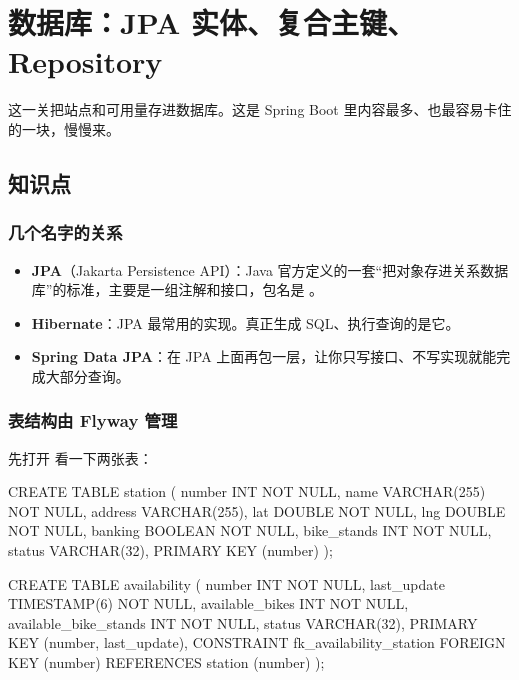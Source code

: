 \chapter{数据库：JPA 实体、复合主键、Repository}

这一关把站点和可用量存进数据库。这是 Spring Boot 里内容最多、也最容易卡住的一块，慢慢来。


\section{知识点}

\subsection{几个名字的关系}

\begin{itemize}
  \item \textbf{JPA}（Jakarta Persistence API）：Java 官方定义的一套“把对象存进关系数据库”的标准，主要是一组注解和接口，包名是 。
  \item \textbf{Hibernate}：JPA 最常用的实现。真正生成 SQL、执行查询的是它。
  \item \textbf{Spring Data JPA}：在 JPA 上面再包一层，让你只写接口、不写实现就能完成大部分查询。
\end{itemize}

\subsection{表结构由 Flyway 管理}

先打开  看一下两张表：

\begin{sql}
CREATE TABLE station (
    number      INT          NOT NULL,
    name        VARCHAR(255) NOT NULL,
    address     VARCHAR(255),
    lat         DOUBLE       NOT NULL,
    lng         DOUBLE       NOT NULL,
    banking     BOOLEAN      NOT NULL,
    bike_stands INT          NOT NULL,
    status      VARCHAR(32),
    PRIMARY KEY (number)
);

CREATE TABLE availability (
    number                INT          NOT NULL,
    last_update           TIMESTAMP(6) NOT NULL,
    available_bikes       INT          NOT NULL,
    available_bike_stands INT          NOT NULL,
    status                VARCHAR(32),
    PRIMARY KEY (number, last_update),
    CONSTRAINT fk_availability_station FOREIGN KEY (number) REFERENCES station (number)
);
\end{sql}

